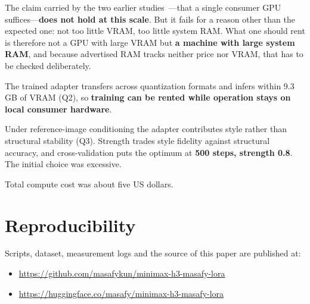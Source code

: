 \documentclass[10pt,twocolumn]{article}
\begin{document}
The claim carried by the two earlier studies~\cite{suzuki2026sd15lora,suzuki2026krea2lora}---that a single consumer GPU suffices---\textbf{does not hold at this scale}. But it fails for a reason other than the expected one: not too little VRAM, too little system RAM. What one should rent is therefore not a GPU with large VRAM but \textbf{a machine with large system RAM}, and because advertised RAM tracks neither price nor VRAM, that has to be checked deliberately.

The trained adapter transfers across quantization formats and infers within 9.3\,GB of VRAM (Q2), so \textbf{training can be rented while operation stays on local consumer hardware}.

Under reference-image conditioning the adapter contributes style rather than structural stability (Q3). Strength trades style fidelity against structural accuracy, and cross-validation puts the optimum at \textbf{500 steps, strength 0.8}. The initial choice was excessive.

Total compute cost was about five US dollars.

\section*{Reproducibility}

Scripts, dataset, measurement logs and the source of this paper are published at:

\begin{itemize}[leftmargin=1.4em,topsep=2pt,itemsep=0pt]
\item \url{https://github.com/masafykun/minimax-h3-masafy-lora}
\item \url{https://huggingface.co/masafy/minimax-h3-masafy-lora}
\end{itemize}
\end{document}

